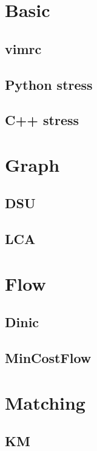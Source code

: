 \section{Basic}
	\subsection{vimrc}
			
	\subsection{Python stress}
				
	
	\subsection{C++ stress}
				
\newpage			
\section{Graph}
	\subsection{DSU}
		
	\subsection{LCA}
		
		
\section{Flow}
	\subsection{Dinic}
		
	\subsection{MinCostFlow}
		
		
\section{Matching}
	\subsection{KM}
		
		
